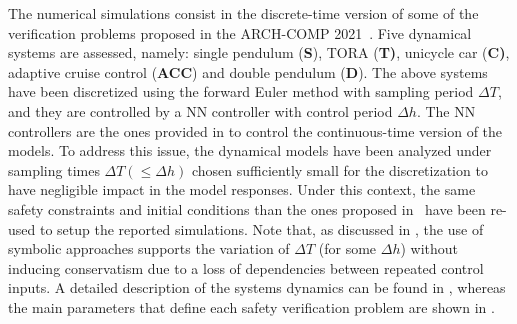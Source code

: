 \documentclass[journal]{IEEEtran}
\begin{document}
The numerical simulations consist in  the discrete-time version of some of the verification problems proposed in the ARCH-COMP 2021~\cite{johnson2021arch}. Five dynamical systems are assessed, namely: single pendulum (\textbf{S}), TORA (\textbf{T)}, unicycle car (\textbf{C)}, adaptive cruise control (\textbf{ACC}) and double pendulum (\textbf{D}).  The above systems have been discretized using the forward Euler method with sampling period $\Delta T$, and they are controlled by a NN controller with control period $\Delta h$. The NN controllers are the ones provided in \cite{johnson2021arch} to control the continuous-time version of the models. To address this issue, the dynamical models have been analyzed under sampling times $\Delta T (\leq \Delta h)$ chosen sufficiently small for the discretization to have negligible impact in the model responses. Under this context, the same safety constraints and initial conditions than the ones proposed in~\cite{johnson2021arch} have been re-used to setup the reported simulations. Note that, as discussed in , the use of symbolic approaches supports the variation of $\Delta T$ (for some $\Delta h$) without inducing conservatism due to a loss  of dependencies between repeated control inputs. A detailed description of the systems dynamics can be found in \cite{johnson2021arch}, whereas the main parameters that define each safety verification problem are shown in .

\end{document}
